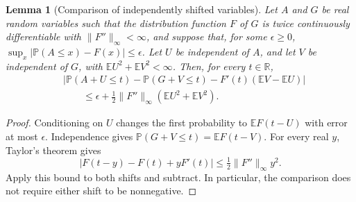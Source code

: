 \documentclass[11pt,letterpaper]{article}
\newtheorem{lemma}{Lemma}
\theoremstyle{remark}
\newcommand{\E}{\mathbb E}
\newcommand{\Pp}{\mathbb P}
\newcommand{\R}{\mathbb R}
\begin{document}
\begin{lemma}[Comparison of independently shifted variables]
\label{lower:shift-comparison}
Let \(A\) and \(G\) be real random variables such that the distribution
function \(F\) of \(G\) is twice continuously differentiable with
\(\|F''\|_\infty<\infty\), and suppose that, for some \(\epsilon\ge0\),
\(\sup_x|\Pp(A\le x)-F(x)|\le\epsilon\).
Let \(U\) be independent of \(A\), and let \(V\) be independent of \(G\),
with \(\E U^2+\E V^2<\infty\). Then, for every \(t\in\R\),
\begin{equation}
\begin{split}
&\left|\Pp(A+U\le t)-\Pp(G+V\le t)
       -F'(t)(\E V-\E U)\right|\\
&\hspace{2em}\le \epsilon+
       \frac12\|F''\|_\infty(\E U^2+\E V^2).
\end{split}
\label{lower:eq:shift-comparison}
\end{equation}
\end{lemma}

\begin{proof}
Conditioning on \(U\) changes the first probability to
\(\E F(t-U)\) with error at most \(\epsilon\). Independence gives
\(\Pp(G+V\le t)=\E F(t-V)\). For every real \(y\), Taylor's theorem gives
\[
 |F(t-y)-F(t)+yF'(t)|\le \tfrac12\|F''\|_\infty y^2.
\]
Apply this bound to both shifts and subtract. In particular, the
comparison does not require either shift to be nonnegative.
\end{proof}
\end{document}
